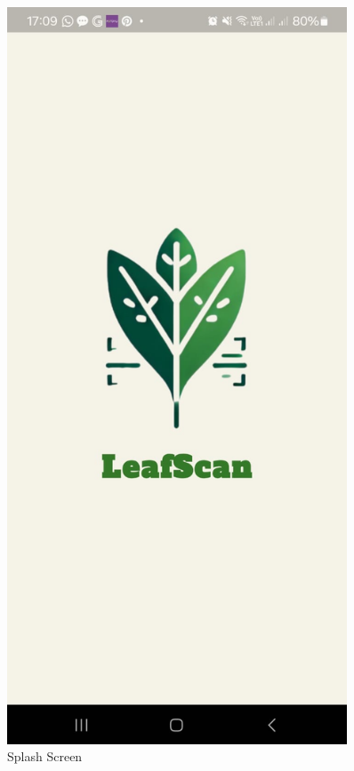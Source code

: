 \documentclass[journal,article,submit,pdftex,moreauthors]{Definitions/mdpi}
\begin{document}
\begin{itemize}
\begin{itemize}
\begin{figure}[H]
\begin{minipage}{0.4\textwidth}
                \label{fig:not-leaf}
           \end{minipage}
            \hfill
            \begin{minipage}{0.4\textwidth}
                \centering
                \includegraphics[width=0.9\textwidth]{Images/splash screen.jpeg}
                \caption{\centering Splash Screen}
                \label{fig:splash-screen}
            \end{minipage}
        \end{figure}
    \end{itemize}


\end{itemize}
\end{document}
